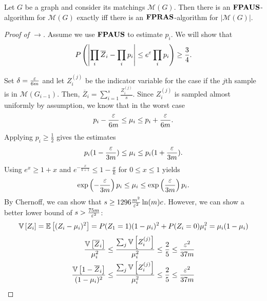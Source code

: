 \begin{lemma}
    Let $G$ be a graph and consider its matchings $\mathcal M(G)$.
    Then there is an $\mathbf{FPAUS}$-algorithm for $\mathcal M(G)$ exactly iff there is an $\mathbf{FPRAS}$-algorithm for $|\mathcal M(G)|$.
\end{lemma}
\begin{proof}[Proof of $\rightarrow$]
    Assume we use $\mathbf{FPAUS}$ to estimate $p_i$.
    We will show that
    \begin{align}
        P\left(\left| \prod_i \overline Z_i - \prod_i p_i  \right| \leq e^{\varepsilon}\prod_i p_i \right)  \geq \frac{3}{4}.
    \end{align}

    Set $\delta = \frac{\varepsilon}{6m}$ and let $Z_i^{(j)}$ be the indicator variable for the case
    if the $j$th sample is in $\mathcal M(G_{i-1})$.
    Then, $\overline{Z}_i = \sum_{i=1}^{s} \frac{Z_i^{(j)}}{s}$.
    Since $Z_i^{(j)}$ is sampled almost uniformly by assumption, we know that in the worst case
    \begin{align*}
        p_i - \frac{\varepsilon}{6m} \leq \mu_i \leq p_i + \frac{\varepsilon}{6m}.
    \end{align*}
    Applying $p_i \geq \frac{1}{2}$ gives the estimates
    \begin{align*}
        p_i (1 - \frac{\varepsilon}{3m}) \leq \mu_i \leq p_i (1 + \frac{\varepsilon}{3m}).
    \end{align*}
    Using $e^x \geq 1 + x$ and $e^{-\frac{x}{k+1}} \leq 1 - \frac{x}{k}$ for $0 \leq x \leq 1$
    yields
    \begin{align*}
        \exp\left(-\frac{\varepsilon}{3m}\right)p_i \leq \mu_i \leq \exp\left(\frac{\varepsilon}{3m}\right)p_i.
    \end{align*}
    By Chernoff, we can show that $s \geq 1296 \frac{m^2}{\varepsilon^2}\ln(m)c$.
    However, we can show a better lower bound of $s > \frac{75m}{\varepsilon^2}$:
    \begin{align*}
        \mathbb{V}\left[Z_i\right] = \mathbb{E}\left[(Z_i - \mu_i)^2\right] = P(Z_1 = 1)(1-\mu_i)^2 + P(Z_i=0)\mu_i^2 = \mu_i(1-\mu_i)
    \end{align*}
    \begin{align*}
        \frac{\mathbb{V}\left[\overline{Z}_i\right]}{\mu_i^2}       & \leq \frac{\sum_j \mathbb{V}\left[Z_i^{(j)}\right]}{\mu_i^2} \leq \frac{2}{5} \leq \frac{\varepsilon^2}{37m} \\
        \frac{\mathbb{V}\left[1-\overline{Z}_i\right]}{(1-\mu_i)^2} & \leq \frac{\sum_j \mathbb{V}\left[Z_i^{(j)}\right]}{\mu_i^2} \leq \frac{2}{5} \leq \frac{\varepsilon^2}{37m} \\
    \end{align*}

\end{proof}
